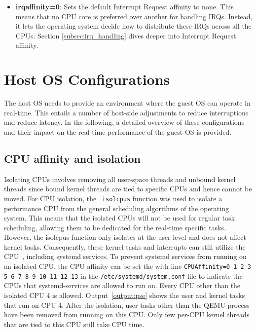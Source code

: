 \documentclass[MMR,Master,english]{twbook}
\begin{document}
\begin{itemize}
	\item \textbf{irqaffinity=0}: Sets the default Interrupt Request affinity to none. This means that no CPU core is preferred over another for handling IRQs. Instead, it lets the operating system decide how to distribute these IRQs across all the CPUs. Section \ref{subsec:irq_handling} dives deeper into Interrupt Request affinity.
\end{itemize}

\section{Host OS Configurations}\label{sec:host_configurations}
The host OS needs to provide an environment where the guest OS can operate in real-time. This entails a number of host-side adjustments to reduce interruptions and reduce latency. In the following, a detailed overview of these configurations and their impact on the real-time performance of the guest OS is provided.
\subsection{CPU affinity and isolation}\label{subsec:cpu_isolation}

Isolating CPUs involves removing all user-space threads and unbound kernel threads since bound kernel threads are tied to specific CPUs and hence cannot be moved. For CPU isolation, the ~\texttt{isolcpus} function was used to isolate a performance CPU from the general scheduling algorithms of the operating system. This means that the isolated CPUs will not be used for regular task scheduling, allowing them to be dedicated for the real-time specific tasks. However, the isolcpus function only isolates at the user level and does not affect kernel tasks. Consequently, these kernel tasks and interrupts can still utilize the CPU~\cite{maPerformanceTuningKVMbased}, including systemd services. To prevent systemd services from running on an isolated CPU, the CPU affinity can be set the with line \texttt{CPUAffinity=0 1 2 3 5 6 7 8 9 10 11 12 13} in the \texttt{/etc/systemd/system.conf} file to indicate the CPUs that systemd-services are allowed to run on. Every CPU other than the isolated CPU 4 is allowed. Output~\ref{output:pse} shows the user and kernel tasks that run on CPU 4. After the isolation, user tasks other than the QEMU process have been removed from running on this CPU. Only few per-CPU kernel threads that are tied to this CPU still take CPU time.
\end{document}
